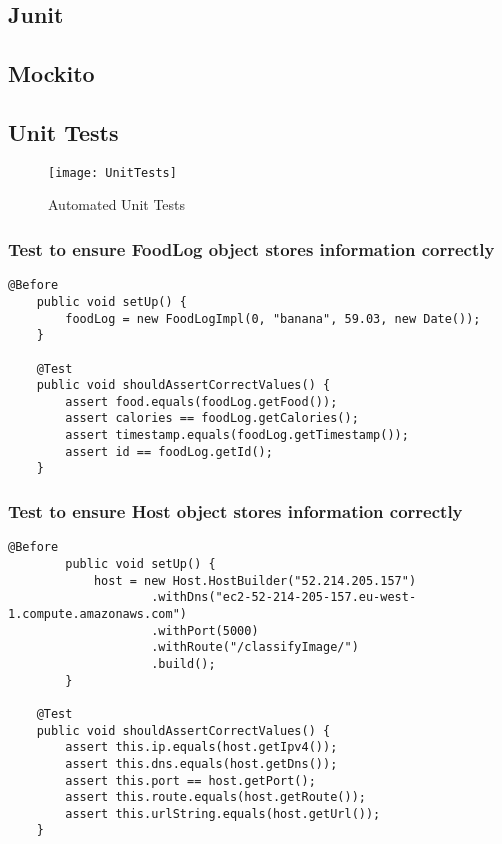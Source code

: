 \subsection*{Junit}

\subsection*{Mockito}

\subsection*{Unit Tests}

\begin{figure}[h]
    \texttt{[image: UnitTests]}
    \caption{Automated Unit Tests}
    \label{fig:unitTests}
\end{figure}

\subsubsection*{Test to ensure FoodLog object stores information correctly}
\begin{lstlisting}[style=Java]
	@Before
    public void setUp() {
        foodLog = new FoodLogImpl(0, "banana", 59.03, new Date());
    }

	@Test
	public void shouldAssertCorrectValues() {
	    assert food.equals(foodLog.getFood());
	    assert calories == foodLog.getCalories();
	    assert timestamp.equals(foodLog.getTimestamp());
	    assert id == foodLog.getId();
	}
\end{lstlisting}

\subsubsection*{Test to ensure Host object stores information correctly}
\begin{lstlisting}[style=Java]
	@Before
	    public void setUp() {
	        host = new Host.HostBuilder("52.214.205.157")
	                .withDns("ec2-52-214-205-157.eu-west-1.compute.amazonaws.com")
	                .withPort(5000)
	                .withRoute("/classifyImage/")
	                .build();
	    }

    @Test
    public void shouldAssertCorrectValues() {
        assert this.ip.equals(host.getIpv4());
        assert this.dns.equals(host.getDns());
        assert this.port == host.getPort();
        assert this.route.equals(host.getRoute());
        assert this.urlString.equals(host.getUrl());
    }
\end{lstlisting}

